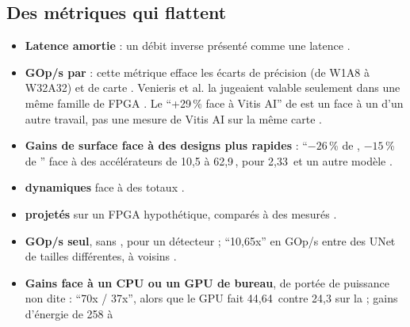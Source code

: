 \subsection{Des métriques qui flattent}

\begin{itemize}
  \item \textbf{Latence amortie} : un débit inverse présenté comme une latence
    \citep[§IV-E]{2024-que-low-latency-variational-autoencoder-fpgas}.
  \item \textbf{GOp/s par } : cette métrique efface les écarts de précision (de W1A8 à
    W32A32) et de carte
    \citep[Table~III]{2023-montgomerie-corcoran-satay-streaming-architecture-toolflow-accelerating}.
    Venieris et al. la jugeaient valable seulement dans une même famille de FPGA
    \citep[§3.1]{2018-venieris-toolflows-mapping-convolutional-neural-networks}. Le
    \enquote{+29\,\% face à Vitis AI} de \citet{2024-yan-fpga-yolov5-accelerator-real-time}
    est un  face à un  d'un autre travail, pas une mesure de Vitis AI sur la
    même carte .
  \item \textbf{Gains de surface face à des designs plus rapides} : \enquote{$-26$\,\% de
    , $-15$\,\% de } face à des accélérateurs de 10,5 à 62,9\,, pour 2,33\, et
    un autre modèle \citep[Table~9]{2025-kim-design-implementation-yolov2-accelerator-zynq}.
  \item \textbf{ dynamiques} face à des  totaux
    \citep[Table~8]{2023-zhai-fpga-vehicle-detection-tracking-accelerator}.
  \item \textbf{ projetés} sur un FPGA hypothétique, comparés à des  mesurés
    \citep[Tables~16--17]{2019-coutinho-deep-neural-network-hardware-implementation}.
  \item \textbf{GOp/s seul}, sans , pour un détecteur
    \citep[Table~5]{arxiv-1809.04570-finn-r-end-end-deep} ; \enquote{10,65x} en GOp/s
    entre des UNet de tailles différentes, à  voisins
    \citep[§V-D]{arxiv-2403.18921-smof-streaming-modern-cnns-fpgas}\pp.
  \item \textbf{Gains face à un CPU ou un GPU de bureau}, de portée de puissance non dite :
    \enquote{70x / 37x}, alors que le GPU fait 44,64\, contre 24,3 sur la 
    \citep[Table~10]{2026-fata-low-cost-fpga-enhanced-cnn} ; gains d'énergie de 258 à

\end{itemize}
